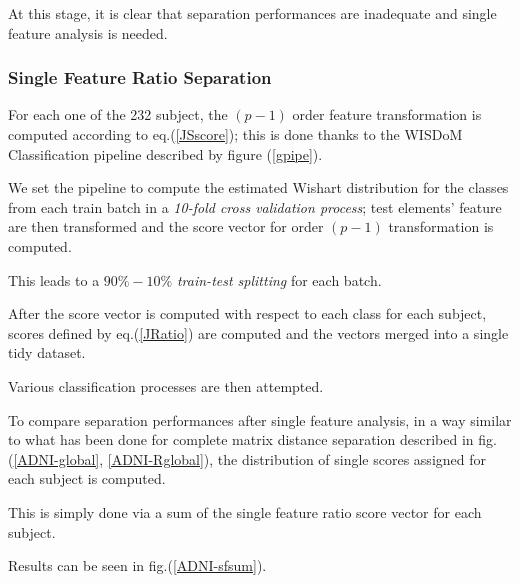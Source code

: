 \documentclass[12pt,openright,twoside,a4paper]{book}
\begin{document}
At this stage, it is clear that separation performances are inadequate and single feature analysis is needed.

\subsubsection{Single Feature Ratio Separation}

For each one of the 232 subject, the $(p-1)$ order feature transformation is computed according to eq.(\ref{JSscore}); this is done thanks to the WISDoM Classification pipeline described by figure (\ref{gpipe}).

We set the pipeline to compute the estimated Wishart distribution for the classes from each train batch in a \textit{10-fold cross validation process}; test elements' feature are then transformed and the score vector for order $(p-1)$ transformation is computed.

This leads to a $90\%-10\%$  \textit{train-test splitting} for each batch.

After the score vector is computed with respect to each class for each subject, scores defined by eq.(\ref{JRatio}) are computed and the vectors merged into a single tidy dataset.

Various classification processes are then attempted.
\vspace{5mm}

To compare separation performances after single feature analysis, in a way similar to what has been done for complete matrix distance separation described in fig.(\ref{ADNI-global}, \ref{ADNI-Rglobal}), the distribution of single scores assigned for each subject is computed.

This is simply done via a sum of the single feature ratio score vector for each subject. 

Results can be seen in fig.(\ref{ADNI-sfsum}).
\end{document}
